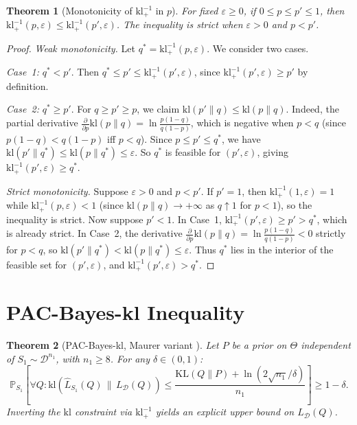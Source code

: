 \documentclass[11pt,a4paper]{article}
\newtheorem{theorem}{Theorem}
\newcommand{\kl}{\mathrm{kl}}
\newcommand{\KL}{\mathrm{KL}}
\newcommand{\cD}{\mathcal{D}}
\newcommand{\Prob}{\mathbb{P}}
\newcommand{\klinv}{\kl^{-1}_+}
\begin{document}
\begin{theorem}[Monotonicity of $\klinv$ in $p$]
\label{thm:mono-p}
For fixed $\varepsilon \ge 0$, if $0 \le p \le p' \le 1$, then $\klinv(p,\varepsilon) \le \klinv(p',\varepsilon)$. The inequality is strict when $\varepsilon > 0$ and $p < p'$.
\end{theorem}

\begin{proof}
\emph{Weak monotonicity.} Let $q^* = \klinv(p,\varepsilon)$. We consider two cases.

\emph{Case~1:} $q^* < p'$. Then $q^* \le p' \le \klinv(p',\varepsilon)$, since $\klinv(p',\varepsilon) \ge p'$ by definition.

\emph{Case~2:} $q^* \ge p'$. For $q \ge p' \ge p$, we claim $\kl(p'\|q) \le \kl(p\|q)$. Indeed, the partial derivative $\frac{\partial}{\partial p}\kl(p\|q) = \ln\frac{p(1-q)}{q(1-p)}$, which is negative when $p < q$ (since $p(1-q) < q(1-p)$ iff $p < q$). Since $p \le p' \le q^*$, we have $\kl(p'\|q^*) \le \kl(p\|q^*) \le \varepsilon$. So $q^*$ is feasible for $(p',\varepsilon)$, giving $\klinv(p',\varepsilon) \ge q^*$.

\emph{Strict monotonicity.} Suppose $\varepsilon > 0$ and $p < p'$. If $p' = 1$, then $\klinv(1,\varepsilon) = 1$ while $\klinv(p,\varepsilon) < 1$ (since $\kl(p\|q) \to +\infty$ as $q \uparrow 1$ for $p < 1$), so the inequality is strict. Now suppose $p' < 1$. In Case~1, $\klinv(p',\varepsilon) \ge p' > q^*$, which is already strict. In Case~2, the derivative $\frac{\partial}{\partial p}\kl(p\|q) = \ln\frac{p(1-q)}{q(1-p)} < 0$ strictly for $p < q$, so $\kl(p'\|q^*) < \kl(p\|q^*) \le \varepsilon$. Thus $q^*$ lies in the interior of the feasible set for $(p',\varepsilon)$, and $\klinv(p',\varepsilon) > q^*$.
\end{proof}

\section{PAC-Bayes-kl Inequality}

\begin{theorem}[PAC-Bayes-kl, Maurer variant {\cite{maurer2004}}]
\label{thm:pac-bayes-kl}
Let $P$ be a prior on $\Theta$ independent of $S_1 \sim \cD^{n_1}$, with $n_1 \ge 8$. For any $\delta \in (0,1)$:
\[
\Prob_{S_1}\!\left[\forall Q: \kl\!\left(\hat{L}_{S_1}(Q) \,\|\, L_\cD(Q)\right) \le \frac{\KL(Q\|P) + \ln(2\sqrt{n_1}/\delta)}{n_1}\right] \ge 1 - \delta.
\]
Inverting the $\kl$ constraint via $\klinv$ yields an explicit upper bound on $L_\cD(Q)$.
\end{theorem}
\end{document}
